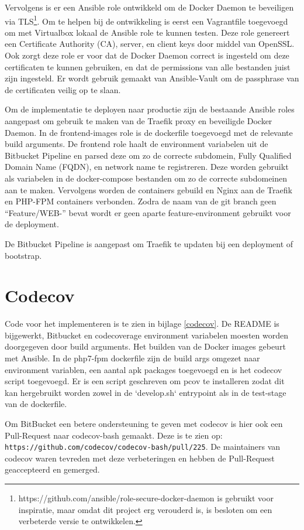 Vervolgens is er een Ansible role ontwikkeld om de Docker Daemon te beveiligen via TLS\footnote{https://github.com/ansible/role-secure-docker-daemon is gebruikt voor inspiratie, maar omdat dit project erg verouderd is, is besloten om een verbeterde versie te ontwikkelen.}. Om te helpen bij de ontwikkeling is eerst een Vagrantfile toegevoegd om met Virtualbox lokaal de Ansible role te kunnen testen. Deze role genereert een Certificate Authority (CA), server, en client keys door middel van OpenSSL. Ook zorgt deze role er voor dat de Docker Daemon correct is ingesteld om deze certificaten te kunnen gebruiken, en dat de permissions van alle bestanden juist zijn ingesteld. Er wordt gebruik gemaakt van Ansible-Vault om de passphrase van de certificaten veilig op te slaan.

Om de implementatie te deployen naar productie zijn de bestaande Ansible roles aangepast om gebruik te maken van de Traefik proxy en beveiligde Docker Daemon. In de frontend-images role is de dockerfile toegevoegd met de relevante build arguments. De frontend role haalt de environment variabelen uit de Bitbucket Pipeline en parsed deze om zo de correcte subdomein, Fully Qualified Domain Name (FQDN), en network name te registreren. Deze worden gebruikt als variabelen in de docker-compose bestanden om zo de correcte subdomeinen aan te maken. Vervolgens worden de containers gebuild en Nginx aan de Traefik en PHP-FPM containers verbonden. Zodra de naam van de git branch geen \enquote{Feature/WEB-} bevat wordt er geen aparte feature-environment gebruikt voor de deployment.

De Bitbucket Pipeline is aangepast om Traefik te updaten bij een deployment of bootstrap.

\section{Codecov}
Code voor het implementeren is te zien in bijlage \ref{codecov}. De README is bijgewerkt, Bitbucket en codecoverage environment variabelen moesten worden doorgegeven door build arguments. Het builden van de Docker images gebeurt met Ansible. In de php7-fpm dockerfile zijn de build args omgezet naar environment variablen, een aantal apk packages toegevoegd en is het codecov script toegevoegd. Er is een script geschreven om pcov te installeren zodat dit kan hergebruikt worden zowel in de `develop.sh` entrypoint als in de test-stage van de dockerfile.

Om BitBucket een betere ondersteuning te geven met codecov is hier ook een Pull-Request naar codecov-bash gemaakt. Deze is te zien op:\\ \texttt{https://github.com/codecov/codecov-bash/pull/225}. De maintainers van codecov waren tevreden met deze verbeteringen en hebben de Pull-Request geaccepteerd en gemerged.

